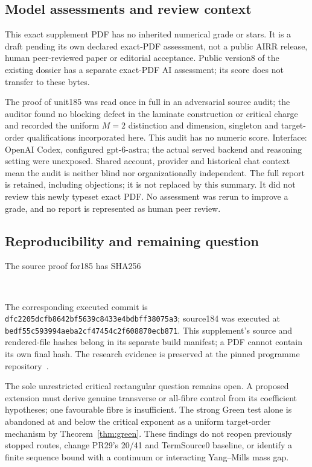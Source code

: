 \documentclass[11pt]{article}
\begin{document}
\subsection{Model assessments and review context}
This exact supplement PDF has no inherited numerical grade or stars.
It is a draft pending its own declared exact-PDF assessment, not a public
AIRR release, human peer-reviewed paper or editorial acceptance. Public
version8 of the existing dossier has a separate exact-PDF AI assessment;
its score does not transfer to these bytes.

The proof of unit185 was read once in full in an adversarial source audit;
the auditor found no blocking defect in the laminate construction or
critical charge and recorded the uniform $M=2$ distinction and dimension,
singleton and target-order qualifications incorporated here. This audit
has no numeric score. Interface: OpenAI Codex, configured gpt-6-astra;
the actual served backend and reasoning setting were unexposed. Shared
account, provider and historical chat context mean the audit is neither
blind nor organizationally independent. The full report is retained,
including objections; it is not replaced by this summary. It did not
review this newly typeset exact PDF. No assessment was rerun to improve
a grade, and no report is represented as human peer review.

\subsection{Reproducibility and remaining question}
The source proof for185 has SHA256
\begin{center}\small\texttt{}\\
\texttt{}\end{center}
The corresponding executed commit is
\texttt{dfc2205dcfb8642bf5639c8433e4bdbff38075a3};
source184 was executed at
\texttt{bedf55c593994aeba2cf47454c2f608870ecb871}.
This supplement's source and rendered-file hashes belong in its separate
build manifest; a PDF cannot contain its own final hash. The research
evidence is preserved at the pinned programme repository~\cite{evidence}.

The sole unrestricted critical rectangular question remains open.
A proposed extension must derive genuine transverse or all-fibre control
from its coefficient hypotheses; one favourable fibre is insufficient.
The strong Green test alone is abandoned at and below the critical
exponent as a uniform target-order mechanism by Theorem~\ref{thm:green}.
These findings do not reopen previously stopped routes, change PR29's
20/41 and TermSource0 baseline, or identify a finite sequence bound with
a continuum or interacting Yang--Mills mass gap.
\end{document}
